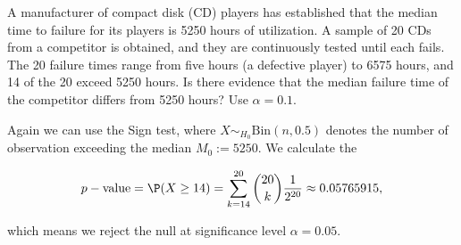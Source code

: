 
\begin{exercise}

A manufacturer of compact disk (CD) players has established that the
median time to failure for its players is 5250 hours of utilization.
A sample of 20 CDs from a competitor is obtained, and they are continuously
tested until each fails. The 20 failure times range from five hours
(a defective player) to 6575 hours, and 14 of the 20 exceed 5250 hours.
Is there evidence that the median failure time of the competitor differs
from 5250 hours? Use $\alpha = 0.1$. 

\end{exercise}


\begin{solution}

Again we can use the Sign test, where $X \sim_{H_0} \text{Bin}(n, 0.5)$
denotes the number of observation exceeding the median $M_0 := 5250$.
We calculate the

\begin{align*}
    p-\text{value} = \P(X \geq 14) = \sum_{k=14}^{20} \binom{20}{k}\frac{1}{2^{20}}
    \approx 0.05765915,
\end{align*}

which means we reject the null at significance level $\alpha = 0.05$.

\end{solution}

